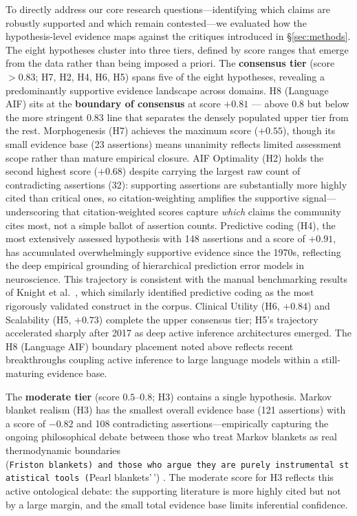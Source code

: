 \documentclass[
  english,
]{article}
\begin{document}
To directly address our core research questions---identifying which
claims are robustly supported and which remain contested---we evaluated
how the hypothesis-level evidence maps against the critiques introduced
in \S\ref{sec:methods}. The eight hypotheses cluster into three tiers,
defined by score ranges that emerge from the data rather than being
imposed a priori. The \textbf{consensus tier} (score \(> 0.83\); H7, H2,
H4, H6, H5) spans five of the eight hypotheses, revealing a
predominantly supportive evidence landscape across domains. H8 (Language
AIF) sits at the \textbf{boundary of consensus} at score \(+0.81\) ---
above 0.8 but below the more stringent 0.83 line that separates the
densely populated upper tier from the rest. Morphogenesis (H7) achieves
the maximum score (\(+0.55\)), though its small evidence base (23
assertions) means unanimity reflects limited assessment scope rather
than mature empirical closure. AIF Optimality (H2) holds the second
highest score (\(+0.68\)) despite carrying the largest raw count of
contradicting assertions (32): supporting assertions are substantially
more highly cited than critical ones, so citation-weighting amplifies
the supportive signal---underscoring that citation-weighted scores
capture \textit{which} claims the community cites most, not a simple
ballot of assertion counts. Predictive coding (H4), the most extensively
assessed hypothesis with 148 assertions and a score of \(+0.91\), has
accumulated overwhelmingly supportive evidence since the 1970s,
reflecting the deep empirical grounding of hierarchical prediction error
models in neuroscience. This trajectory is consistent with the manual
benchmarking results of Knight et al.~\citep{knight2022fep}, which
similarly identified predictive coding as the most rigorously validated
construct in the corpus. Clinical Utility (H6, \(+0.84\)) and
Scalability (H5, \(+0.73\)) complete the upper consensus tier; H5's
trajectory accelerated sharply after 2017 as deep active inference
architectures emerged. The H8 (Language AIF) boundary placement noted
above reflects recent breakthroughs coupling active inference to large
language models within a still-maturing evidence base.

The \textbf{moderate tier} (score \(0.5\)--\(0.8\); H3) contains a
single hypothesis. Markov blanket realism (H3) has the smallest overall
evidence base (121 assertions) with a score of \(-0.82\) and 108
contradicting assertions---empirically capturing the ongoing
philosophical debate between those who treat Markov blankets as real
thermodynamic boundaries
(\texttt{Friston\ blankets\textquotesingle{}\textquotesingle{})\ and\ those\ who\ argue\ they\ are\ purely\ instrumental\ statistical\ tools\ (}Pearl
blankets'\,') \citep{bruineberg2022emperor}. The moderate score for H3
reflects this active ontological debate: the supporting literature is
more highly cited but not by a large margin, and the small total
evidence base limits inferential confidence.
\end{document}
